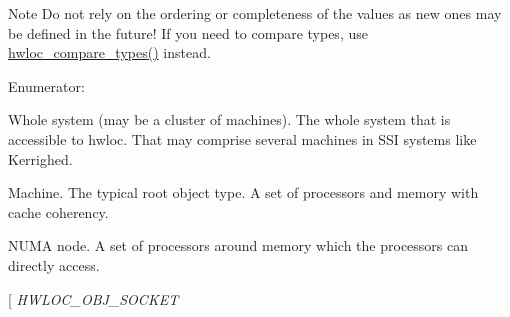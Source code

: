 \begin{DoxyNote}{Note}
Do not rely on the ordering or completeness of the values as new ones may be defined in the future! If you need to compare types, use \hyperlink{a00041_gabd7da4f4ea12b420b8ecbde458b27805}{hwloc\_\-compare\_\-types()} instead. 
\end{DoxyNote}
\begin{Desc}
\item[Enumerator: ]\par
\begin{description}
\item[{\em 
\hypertarget{a00041_ggacd37bb612667dc437d66bfb175a8dc55a3aa1b842d1fd4207ebce171f95a244ec}{
HWLOC\_\-OBJ\_\-SYSTEM}
\label{a00041_ggacd37bb612667dc437d66bfb175a8dc55a3aa1b842d1fd4207ebce171f95a244ec}
}]Whole system (may be a cluster of machines). The whole system that is accessible to hwloc. That may comprise several machines in SSI systems like Kerrighed. \item[{\em 
\hypertarget{a00041_ggacd37bb612667dc437d66bfb175a8dc55a3f4e83ffc4a259354959ae8a9eaa2a80}{
HWLOC\_\-OBJ\_\-MACHINE}
\label{a00041_ggacd37bb612667dc437d66bfb175a8dc55a3f4e83ffc4a259354959ae8a9eaa2a80}
}]Machine. The typical root object type. A set of processors and memory with cache coherency. \item[{\em 
\hypertarget{a00041_ggacd37bb612667dc437d66bfb175a8dc55aaf0964881117bdedf1a5e9332cd120dd}{
HWLOC\_\-OBJ\_\-NODE}
\label{a00041_ggacd37bb612667dc437d66bfb175a8dc55aaf0964881117bdedf1a5e9332cd120dd}
}]NUMA node. A set of processors around memory which the processors can directly access. \item[{\em 
\hypertarget{a00041_ggacd37bb612667dc437d66bfb175a8dc55a1ac6e07775ae4324b3fe9dbd72c785ec}{
HWLOC\_\-OBJ\_\-SOCKET}
\label{a00041_ggacd37bb612667dc437d66bfb175a8dc55a1ac6e07775ae4324b3fe9dbd72c785ec}
}
\end{description}
\end{Desc}
